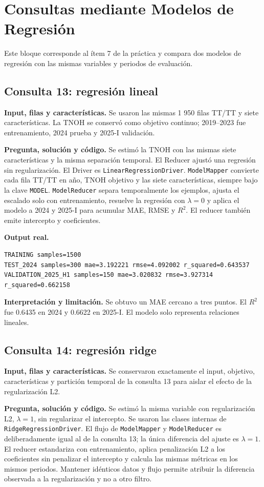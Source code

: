 \documentclass[10pt,a4paper]{article}
\theoremstyle{definition}
\begin{document}
\section{Consultas mediante Modelos de Regresión}
Este bloque corresponde al ítem 7 de la práctica y compara dos modelos de
regresión con las mismas variables y periodos de evaluación.
\subsection{Consulta 13: regresión lineal}
\textbf{Input, filas y características.} Se usaron las mismas 1 950 filas TT/TT
y siete características. La TNOH se conservó como objetivo continuo; 2019--2023
fue entrenamiento, 2024 prueba y 2025-I validación.

\textbf{Pregunta, solución y código.} Se estimó la TNOH con las mismas siete
características y la misma separación temporal. El Reducer ajustó una regresión
sin regularización. El Driver es \texttt{LinearRegressionDriver}.
\texttt{ModelMapper} convierte cada fila TT/TT en año, TNOH objetivo y las siete
características, siempre bajo la clave \texttt{MODEL}. \texttt{ModelReducer}
separa temporalmente los ejemplos, ajusta el escalado solo con entrenamiento,
resuelve la regresión con $\lambda=0$ y aplica el modelo a 2024 y 2025-I para
acumular MAE, RMSE y $R^2$. El reducer también emite intercepto y coeficientes.

\textbf{Output real.}
\begin{lstlisting}[style=resultado]
TRAINING samples=1500
TEST_2024 samples=300 mae=3.192221 rmse=4.092002 r_squared=0.643537
VALIDATION_2025_H1 samples=150 mae=3.020832 rmse=3.927314 r_squared=0.662158
\end{lstlisting}
\textbf{Interpretación y limitación.} Se obtuvo un MAE cercano a tres puntos.
El $R^2$ fue 0.6435 en 2024 y 0.6622 en 2025-I. El modelo solo representa
relaciones lineales.

\subsection{Consulta 14: regresión ridge}
\textbf{Input, filas y características.} Se conservaron exactamente el input,
objetivo, características y partición temporal de la consulta 13 para aislar el
efecto de la regularización L2.

\textbf{Pregunta, solución y código.} Se estimó la misma variable con
regularización L2, $\lambda=1$, sin regularizar el intercepto. Se usaron las
clases internas de \texttt{RidgeRegressionDriver}. El flujo de \texttt{ModelMapper} y
\texttt{ModelReducer} es deliberadamente igual al de la consulta 13; la única
diferencia del ajuste es $\lambda=1$. El reducer estandariza con entrenamiento,
aplica penalización L2 a los coeficientes sin penalizar el intercepto y calcula
las mismas métricas en los mismos periodos. Mantener idénticos datos y flujo
permite atribuir la diferencia observada a la regularización y no a otro filtro.
\end{document}
